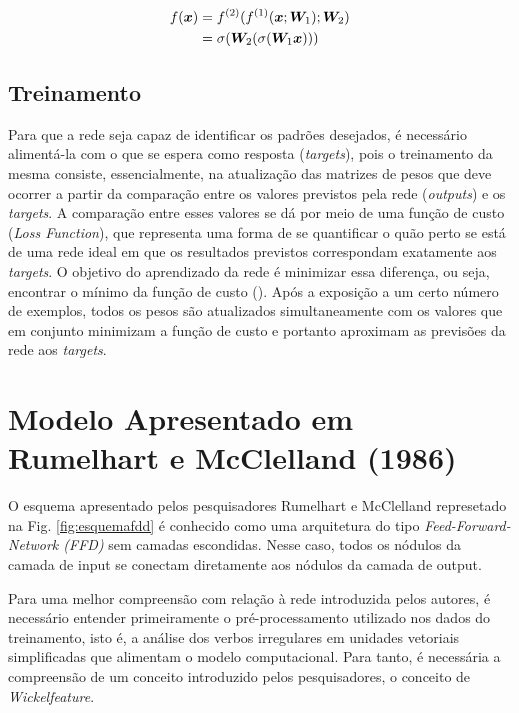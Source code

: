 \begin{align}
f(\bm{x}) &= f^{(2)}(f^{(1)}(\bm{x}; \bm{W}_1); \bm{W}_2)\\
&= \sigma(\bm{W}_2 (\sigma(\bm{W}_1\bm{x})))
\end{align}



\subsection{Treinamento}

Para que a rede seja capaz de identificar os padrões desejados, é necessário alimentá-la com o que se espera como resposta (\textit{targets}), pois o treinamento da mesma consiste, essencialmente, na atualização das matrizes de pesos que deve ocorrer a partir da comparação entre os valores previstos pela rede (\textit{outputs}) e os \textit{targets}. A comparação entre esses valores se dá por meio de uma função de custo (\textit{Loss Function}), que representa uma forma de se quantificar o quão perto se está de uma rede ideal em que os resultados previstos correspondam exatamente aos \textit{targets}. O objetivo do aprendizado da rede é minimizar essa diferença, ou seja, encontrar o mínimo da função de custo (\cite{josh:2017}). Após a exposição a um certo número de exemplos, todos os pesos são atualizados simultaneamente com os valores que em conjunto minimizam a função de custo e portanto aproximam as previsões da rede aos \textit{targets}. %

\section{Modelo Apresentado em Rumelhart e McClelland (1986)}
\label{sec:arqFDD}

O esquema apresentado pelos pesquisadores Rumelhart e McClelland represetado na Fig. \ref{fig:esquemafdd} é conhecido como uma arquitetura do tipo \textit{Feed-Forward-Network (FFD)} sem camadas escondidas. Nesse caso, todos os nódulos da camada de input se conectam diretamente aos nódulos da camada de output.

Para uma melhor compreensão com relação à rede introduzida pelos autores, é necessário entender primeiramente o pré-processamento utilizado nos dados do treinamento, isto é, a análise dos verbos irregulares em unidades vetoriais simplificadas que alimentam o modelo computacional. Para tanto, é necessária a compreensão de um conceito introduzido pelos pesquisadores, o conceito de \textit{Wickelfeature}.

